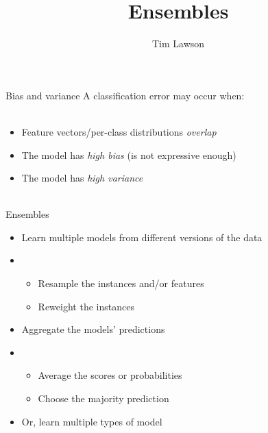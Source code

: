 \documentclass[10pt]{beamer}
\title{Ensembles}
\author{Tim Lawson}
\begin{document}
\maketitle

\begin{frame}{Bias and variance}
  A classification error may occur when:
  \\~\
  \begin{itemize}
    \item Feature vectors/per-class distributions \emph{overlap}
    \item The model has \emph{high bias} (is not expressive enough)
    \item The model has \emph{high variance}
          \\
          ~\
  \end{itemize}
  \parencite[][p. 338–9]{Flach2012}
\end{frame}

\begin{frame}{Ensembles}
  \begin{itemize}
    \item Learn multiple models from different versions of the data
    \item[]
          \begin{itemize}
            \item Resample the instances and/or features
            \item Reweight the instances
          \end{itemize}
    \item Aggregate the models' predictions
    \item[]
          \begin{itemize}
            \item Average the scores or probabilities
            \item Choose the majority prediction
          \end{itemize}
    \item Or, learn multiple types of model
  \end{itemize}
\end{frame}
\end{document}
